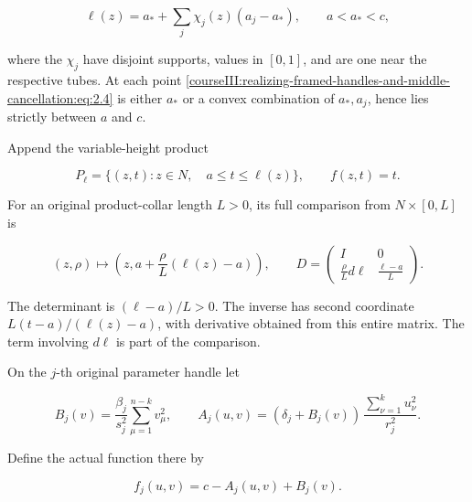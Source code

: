 \begin{equation}
\ell(z)=a_*+\sum_j\chi_j(z)(a_j-a_*),
 \qquad a<a_*<c,
 \label{courseIII:realizing-framed-handles-and-middle-cancellation:eq:2.4}
\end{equation}

where the \(\chi_j\) have disjoint supports, values in \([0,1]\), and are one near the respective tubes. At each point \eqref{courseIII:realizing-framed-handles-and-middle-cancellation:eq:2.4} is either \(a_*\) or a convex combination of \(a_*,a_j\), hence lies strictly between \(a\) and \(c\).

Append the variable-height product

\begin{equation}
P_\ell=\{(z,t):z\in N,\quad a\leq t\leq\ell(z)\},
 \qquad f(z,t)=t.
 \label{courseIII:realizing-framed-handles-and-middle-cancellation:eq:2.5}
\end{equation}

For an original product-collar length \(L>0\), its full comparison from \(N\times[0,L]\) is

\begin{equation}
(z,\rho)\longmapsto
 \left(z,a+\frac{\rho}{L}(\ell(z)-a)\right),
 \qquad
 D=
 \begin{pmatrix}
 I&0\\
 \frac{\rho}{L}d\ell&\frac{\ell-a}{L}
 \end{pmatrix}.
 \label{courseIII:realizing-framed-handles-and-middle-cancellation:eq:2.6}
\end{equation}

The determinant is \((\ell-a)/L>0\). The inverse has second coordinate \(L(t-a)/(\ell(z)-a)\), with derivative obtained from this entire matrix. The term involving \(d\ell\) is part of the comparison.

On the \(j\)-th original parameter handle let

\begin{equation}
B_j(v)=\frac{\beta_j}{s_j^2}\sum_{\mu=1}^{n-k}v_\mu^2,\qquad
 A_j(u,v)=(\delta_j+B_j(v))\,\frac{\sum_{\nu=1}^k u_\nu^2}{r_j^2}.
 \label{courseIII:realizing-framed-handles-and-middle-cancellation:eq:2.7}
\end{equation}

Define the actual function there by

\begin{equation}
f_j(u,v)=c-A_j(u,v)+B_j(v).
 \label{courseIII:realizing-framed-handles-and-middle-cancellation:eq:2.8}
\end{equation}

